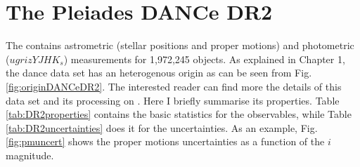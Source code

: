 %

\section{The Pleiades DANCe DR2}
\label{sect:DR2}

The  contains astrometric (stellar positions and proper motions) and photometric ($ugrizYJHK_s$) measurements for 1,972,245 objects. As explained in Chapter 1, the \gls{dance} data set has an heterogenous origin as can be seen from Fig. \ref{fig:originDANCeDR2}. The interested reader can find more the details of this data set and its processing on \citet{Bouy2013}. Here I briefly summarise its properties. Table \ref{tab:DR2properties} contains the basic statistics for the observables, while Table \ref{tab:DR2uncertainties} does it for the uncertainties. As an example, Fig. \ref{fig:pmuncert} shows the proper motions uncertainties as a function of the $i$ magnitude.

